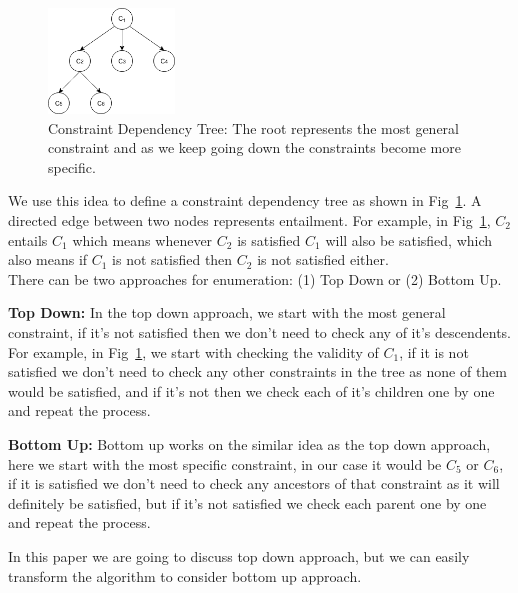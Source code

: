 \documentclass{article}
\begin{document}
\begin{figure}[tb]
    \centering
\includegraphics[width=0.3\textwidth]{images/constraintTree.png}
    \caption{\label{fig:constraintTree} Constraint Dependency Tree: The root represents the most general constraint and as we keep going down the constraints become more specific.}
\end{figure}
We use this idea to define a constraint dependency tree as shown in Fig~\ref{fig:constraintTree}. A directed edge between two nodes represents entailment. For example, in Fig~\ref{fig:constraintTree}, $C_2$ entails $C_1$ which means whenever $C_2$ is satisfied $C_1$ will also be satisfied, which also means if $C_1$ is not satisfied then $C_2$ is not satisfied either.
\\
There can be two approaches for enumeration: (1) Top Down or (2) Bottom Up.
 
\textbf{Top Down:} In the top down approach, we start with the most general constraint, if it's not satisfied then we don't need to check any of it's descendents. For example, in Fig~\ref{fig:constraintTree}, we start with checking the validity of $C_1$, if it is not satisfied we don't need to check any other constraints in the tree as none of them would be satisfied, and if it's not then we check each of it's children one by one and repeat the process.

\textbf{Bottom Up:} Bottom up works on the similar idea as the top down approach, here we start with the most specific constraint, in our case it would be $C_5$ or $C_6$, if it is satisfied we don't need to check any ancestors of that constraint as it will definitely be satisfied, but if it's not satisfied we check each parent one by one and repeat the process.

In this paper we are going to discuss top down approach, but we can easily transform the algorithm to consider bottom up approach. 
\end{document}
